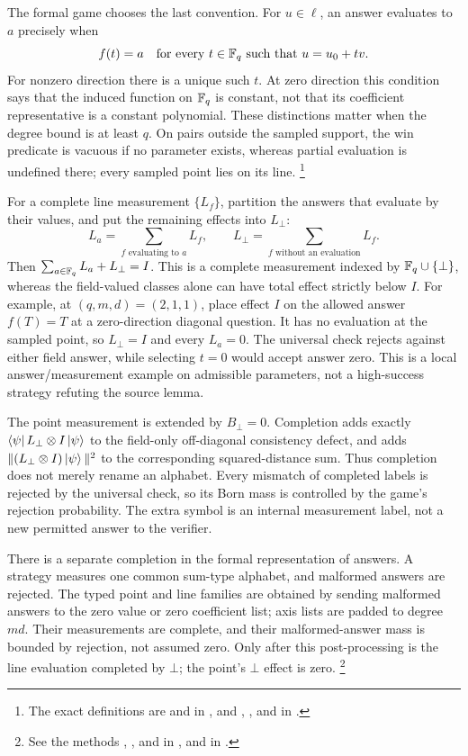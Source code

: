 \documentclass[11pt]{article}
\begin{document}
The formal game chooses the last convention. For $u\in\ell$, an answer
evaluates to $a$ precisely when
\[
  f(t)=a\quad\hbox{for every }t\in\mathbb{F}_q\hbox{ such that }u=u_0+tv.
\]
For nonzero direction there is a unique such $t$. At zero direction this
condition says that the induced function on $\mathbb{F}_q$ is constant, not that its
coefficient representative is a constant polynomial. These distinctions matter
when the degree bound is at least $q$. On pairs outside the sampled support,
the win predicate is vacuous if no parameter exists, whereas partial evaluation
is undefined there; every sampled point lies on its line.%
\footnote{The exact definitions are  and
 in ,
and , , and  in
.}

For a complete line measurement $\{L_f\}$, partition the answers that evaluate
by their values, and put the remaining effects into $L_\bot$:
\[
  L_a=\sum_{f\text{ evaluating to }a}L_f,\qquad
  L_\bot=\sum_{f\text{ without an evaluation}}L_f.
\]
Then $\sum_{a\in\mathbb{F}_q}L_a+L_\bot=I$. This is a complete measurement indexed
by $\mathbb{F}_q\cup\{\bot\}$, whereas
the field-valued classes alone can have total effect strictly below $I$.
For example, at $(q,m,d)=(2,1,1)$, place effect $I$ on the allowed answer
$f(T)=T$ at a zero-direction diagonal question. It has no evaluation at the
sampled point, so $L_\bot=I$ and every $L_a=0$. The universal check rejects
against either field answer, while selecting $t=0$ would accept answer zero.
This is a local answer/measurement example on admissible parameters, not a
high-success strategy refuting the source lemma.

The point measurement is extended by $B_\bot=0$. Completion adds exactly
$\bra\psi L_\bot\otimes I\ket\psi$ to the field-only off-diagonal consistency
defect, and adds $\|(L_\bot\otimes I)\ket\psi\|^2$ to the corresponding
squared-distance sum. Thus completion does not merely rename an alphabet.
Every mismatch of completed labels is rejected by the universal check, so its
Born mass is controlled by the game's rejection probability. The extra symbol
is an internal measurement label, not a new permitted answer to the verifier.

There is a separate completion in the formal representation of answers. A
strategy measures one common sum-type alphabet, and malformed answers are
rejected. The typed point and line families are obtained by sending malformed
answers to the zero value or zero coefficient list; axis lists are padded to
degree $md$. Their measurements are complete, and their malformed-answer mass
is bounded by rejection, not assumed zero. Only after this post-processing is
the line evaluation completed by $\bot$; the point's $\bot$ effect is zero.%
\footnote{See the  methods ,
, and  in
, and
 in
.}
\end{document}
